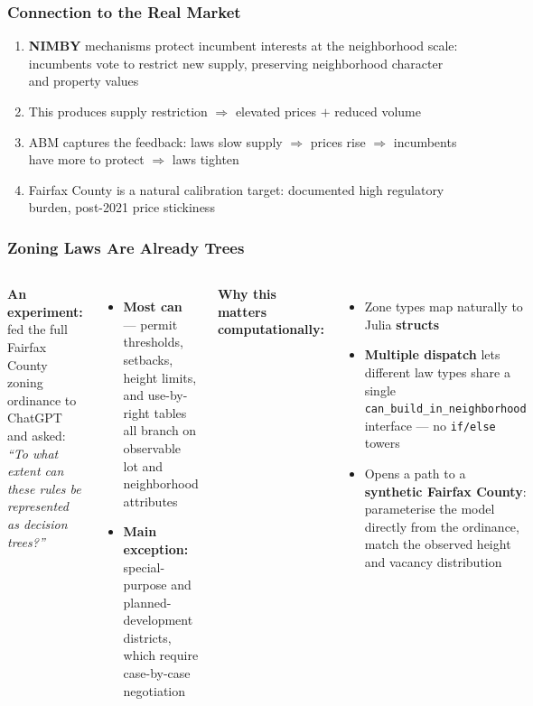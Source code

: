 \documentclass{beamer}
\begin{document}
\begin{frame}
  \frametitle{Connection to the Real Market}
  \begin{enumerate}
    \item \textbf{NIMBY} mechanisms protect incumbent interests at the neighborhood scale:\\
      \textcolor{nimbygray}{incumbents vote to restrict new supply, preserving neighborhood character and property values}
    \item This produces \textcolor{nimbyred}{supply restriction} $\Rightarrow$ elevated prices $+$ reduced volume
    \item ABM captures the \textcolor{nimbygreen}{feedback}: laws slow supply $\Rightarrow$ prices rise $\Rightarrow$ incumbents have more to protect $\Rightarrow$ laws tighten
    \item Fairfax County is a natural calibration target: documented high regulatory burden, post-2021 price stickiness
  \end{enumerate}
\end{frame}

\begin{frame}
  \frametitle{Zoning Laws Are Already Trees}
  \begin{columns}
    \textcolor{nimbyyellow}{\textbf{An experiment:}} fed the full Fairfax County
    zoning ordinance to ChatGPT and asked:\\[0.4em]
    \textit{``To what extent can these rules be represented as decision trees?''}
    \vspace{0.4em}
    \begin{itemize}
      \small
      \item \textcolor{nimbygreen}{\textbf{Most can}} — permit thresholds, setbacks,
        height limits, and use-by-right tables all branch on observable lot and
        neighborhood attributes
      \item \textcolor{nimbyred}{\textbf{Main exception:}} special-purpose and
        planned-development districts, which require case-by-case negotiation
    \end{itemize}
    \textcolor{nimbyblue}{\textbf{Why this matters computationally:}}
    \begin{itemize}
      \small
      \item Zone types map naturally to Julia \textbf{structs}
      \item \textbf{Multiple dispatch} lets different law types share a single
        \texttt{can\_build\_in\_neighborhood} interface — no \texttt{if/else} towers
      \item Opens a path to a \textbf{synthetic Fairfax County}: parameterise
        the model directly from the ordinance, match the observed height and
        vacancy distribution
    \end{itemize}
  \end{columns}
\end{frame}
\end{document}
